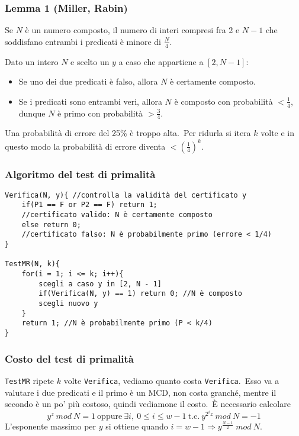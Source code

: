 \subsubsection{Lemma 1 (Miller, Rabin)}

Se $N$ è un numero composto, il numero di interi compresi fra 2 e $N - 1$ che soddisfano entrambi i predicati è minore di $\frac{N}{4}$.\

\vspace{12pt}
\noindent Dato un intero $N$ e scelto un $y$ a caso che appartiene a $[2, N - 1]$:
\begin{itemize}
    \item Se uno dei due predicati è falso, allora $N$ è certamente composto.
    \item Se i predicati sono entrambi veri, allora $N$ è composto con probabilità $< \frac{1}{4}$, dunque $N$ è primo con probabilità $> \frac{3}{4}$.\
\end{itemize}
\vspace{12pt}

\noindent Una probabilità di errore del 25\% è troppo alta.\
Per ridurla si itera $k$ volte e in questo modo la probabilità di errore diventa $< \left(\frac{1}{4}\right)^k$.\

\subsubsection{Algoritmo del test di primalità}

\begin{verbatim}
Verifica(N, y){ //controlla la validità del certificato y
    if(P1 == F or P2 == F) return 1;
    //certificato valido: N è certamente composto
    else return 0;
    //certificato falso: N è probabilmente primo (errore < 1/4)
}

TestMR(N, k){
    for(i = 1; i <= k; i++){
        scegli a caso y in [2, N - 1]
        if(Verifica(N, y) == 1) return 0; //N è composto
        scegli nuovo y
    }
    return 1; //N è probabilmente primo (P < k/4)
}
\end{verbatim}

\subsubsection{Costo del test di primalità}

\texttt{TestMR} ripete $k$ volte \texttt{Verifica}, vediamo quanto costa \texttt{Verifica}.\
Esso va a valutare i due predicati e il primo è un MCD, non costa granché, mentre il secondo è un po' più costoso, quindi vediamone il costo.\
È necessario calcolare
\[y^z\ \mathit{mod}\ N = 1\ \mathrm{oppure}\ \exists i,\ 0\leq i\leq w - 1\ \mathrm{t.c.}\ y^{2^iz}\ \mathit{mod}\ N = -1\]
L'esponente massimo per $y$ si ottiene quando $i=w-1 \Rightarrow y^{\frac{N-1}{2}}\ \mathit{mod}\ N$.\


